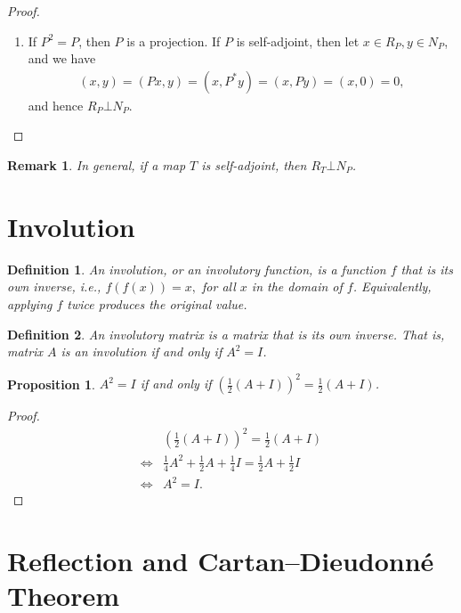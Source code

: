 \documentclass[11pt]{book}
\newtheorem{definition}{Definition}[section]
\newtheorem{proposition}{Proposition}[section]
\newtheorem{remark}{Remark}[section]
\theoremstyle{definition}
\numberwithin{equation}{chapter}
\begin{document}
\begin{subappendices}
\begin{proof}
\begin{enumerate}[label=(\alph*)]
    \item If $P^2 = P$, then $P$ is a projection. If $P$ is self-adjoint, then let $x \in R_P, y \in N_P$, and we have
    \begin{align*}
        (x, y) = (Px, y) = (x, P^*y) = (x, Py) = (x, 0) = 0,
    \end{align*}
    and hence $R_P \bot N_P$.
\end{enumerate}
\end{proof}

\begin{remark}
In general, if a map $T$ is self-adjoint, then $R_T \bot N_P$.
\end{remark}

\medskip

\section{Involution}
\begin{definition}
An involution, or an involutory function, is a function $f$ that is its own inverse, i.e., $f(f(x)) = x,$ for all $x$ in the domain of $f$. Equivalently, applying $f$ twice produces the original value.
\end{definition}

\medskip

\begin{definition}
An involutory matrix is a matrix that is its own inverse. That is, matrix $A$ is an involution if and only if $A^2 = I$.
\end{definition}

\medskip

\begin{proposition}
$A^2 = I$ if and only if $\left(\frac{1}{2} (A + I) \right)^2 = \frac{1}{2} (A + I)$.
\end{proposition}
\begin{proof}
\begin{align*}
    & \left(\frac{1}{2} (A + I) \right)^2 = \frac{1}{2}(A + I) \\
    \Longleftrightarrow & \frac{1}{4} A^2 + \frac{1}{2} A + \frac{1}{4} I = \frac{1}{2} A + \frac{1}{2} I \\
    \Longleftrightarrow & A^2 = I.
\end{align*}
\end{proof}

\medskip

\section{Reflection and Cartan–Dieudonné Theorem}\label{appendix_reflection}


\end{subappendices}
\end{document}
